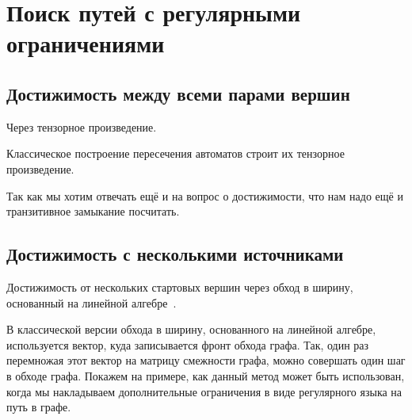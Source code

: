 \chapter{Поиск путей с регулярными ограничениями}

\section{Достижимость между всеми парами вершин}

Через тензорное произведение.

Классическое построение пересечения автоматов строит их тензорное произведение.

Так как мы хотим отвечать ещё и на вопрос о достижимости, что нам надо ещё и транзитивное замыкание посчитать.

\section{Достижимость с несколькими источниками}

Достижимость от нескольких стартовых вершин через обход в ширину, основанный на линейной алгебре~\cite{9286186}.

В классической версии обхода в ширину, основанного на линейной алгебре, используется вектор, куда записывается фронт обхода графа. Так, один раз перемножая этот вектор на матрицу смежности графа, можно совершать один шаг в обходе графа. Покажем на примере, как данный метод может быть использован, когда мы накладываем дополнительные ограничения в виде регулярного языка на путь в графе. 

